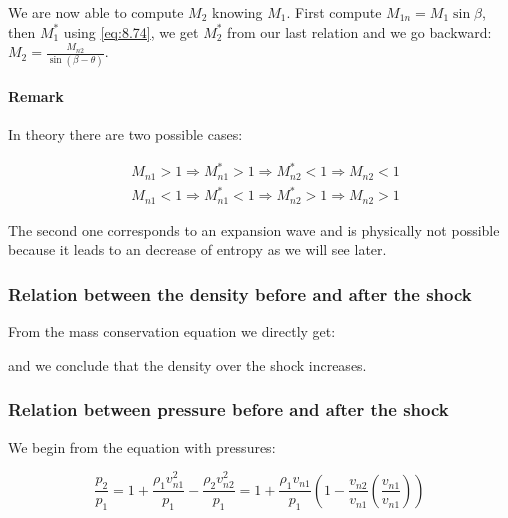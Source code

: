 	We are now able to compute $M_2$ knowing $M_1$. First compute $M_{1n} = M_1 \sin \beta $, then $M_1^*$ using \eqref{eq:8.74}, we get $M_2^*$ from our last relation and we go backward: $M_2 = \frac{M_{n2}}{\sin (\beta -\theta)}$.
	
	\paragraph{Remark} \quad In theory there are two possible cases: 
	
	\begin{equation}
	\begin{aligned}
	&M_{n1} > 1 \Rightarrow M_{n1}^* > 1 \Rightarrow M_{n2}^* < 1 \Rightarrow M_{n2} < 1\\
	 &M_{n1} < 1 \Rightarrow M_{n1}^* < 1 \Rightarrow M_{n2}^* > 1 \Rightarrow M_{n2} > 1
	\end{aligned}
	\end{equation}
	
	The second one corresponds to an expansion wave and is physically not possible because it leads to an decrease of entropy as we will see later. 
	
\subsubsection{Relation between the density before and after the shock}
	From the mass conservation equation we directly get:
	
	\begin{center}
	\end{center}
	and we conclude that the density over the shock increases. 
	
\subsubsection{Relation between pressure before and after the shock}
	We begin from the equation with pressures: 
	
	\begin{equation}
	\frac{p_2}{p_1} = 1 + \frac{\rho _1v_{n1}^2}{p_1} - \frac{\rho _2v_{n2}^2}{p_1} = 1 + \frac{\rho _1v_{n1}}{p_1}\left( 1 - \frac{v_{n2}}{v_{n1}} \left( \frac{v_{n1}}{v_{n1}}\right)\right) 
	\end{equation}
	
